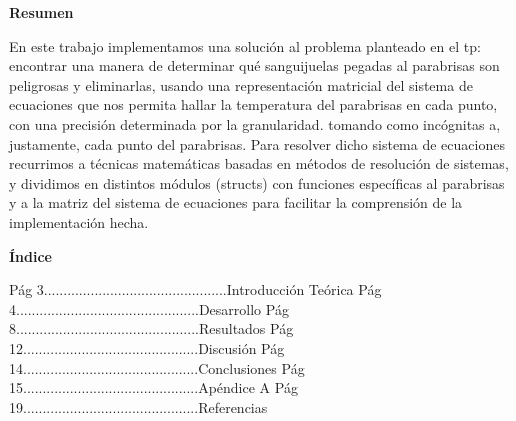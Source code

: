 \documentclass[spanish,a4paper]{article}
\begin{document}
\materia{}


\fecha{\today}


\grupo{}



\maketitle

\clearpage

\nombre{\LARGE }

\LARGE \textbf{Resumen} \\
\normalsize

En este trabajo implementamos una solución al problema planteado en el tp: encontrar una manera de determinar qué sanguijuelas pegadas al parabrisas son peligrosas y eliminarlas, usando una representación matricial del sistema de ecuaciones que nos permita hallar la temperatura del parabrisas en cada punto, con una precisión determinada por la granularidad. tomando como incógnitas a, justamente, cada punto del parabrisas.\newline
Para resolver dicho sistema de ecuaciones recurrimos a técnicas matemáticas basadas en métodos de resolución de sistemas, y dividimos en distintos módulos (structs) con funciones específicas al parabrisas y a la matriz del sistema de ecuaciones para facilitar la comprensión de la implementación hecha.

\newpage

\LARGE \textbf{Índice}
\normalsize

\flushleft

Pág  3...............................................Introducción Teórica\newline \newline 
Pág  4...............................................Desarrollo\newline \newline
Pág  8...............................................Resultados\newline \newline
Pág 12.............................................Discusión\newline \newline
Pág 14.............................................Conclusiones\newline \newline
Pág 15.............................................Apéndice A\newline \newline
Pág 19.............................................Referencias
\end{document}
